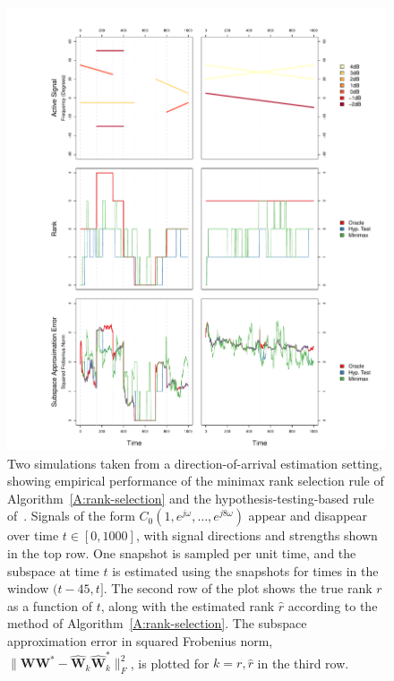 \documentclass[final]{IEEEtran} %
\newcommand{\vectorsymbol}{\underline}
\newcommand{\matrixsymbol}{\boldsymbol}
\newcommand{\mW}{\matrixsymbol{W}}
\newcommand{\mhW}{\widehat{\matrixsymbol{W}}}
\newcommand{\va}{\vectorsymbol{a}}
\begin{document}
\begin{figure}
    \centering
    \includegraphics[width=2.1\columnwidth]{plots/doa-sim}
    \caption{\label{F:simulations} Two simulations taken from a direction-of-arrival estimation setting, showing empirical performance of the minimax rank selection rule of Algorithm~\ref{A:rank-selection} and the hypothesis-testing-based rule of~\cite{kritchman2008dnc}.  Signals of the form  %
    $C_0 ( 1, e^{j \omega}, \ldots, e^{j 8 \omega})$
        appear and disappear over time $t \in [0,1000]$, with signal directions and strengths shown in the top row.  One snapshot is sampled per unit time, and the subspace at time $t$ is estimated using the snapshots for times in the window $(t-45,t]$.  The second row of the plot shows the true rank $r$ as a function of $t$, along with the estimated rank $\hat r$ according to the method of Algorithm~\ref{A:rank-selection}.  The subspace approximation error in squared Frobenius norm, $\|\mW \mW^\ast - \mhW_k \mhW^\ast_k \|_F^2$, is plotted for $k = r, \hat r$ in the third row.
        }
\end{figure}
\end{document}
